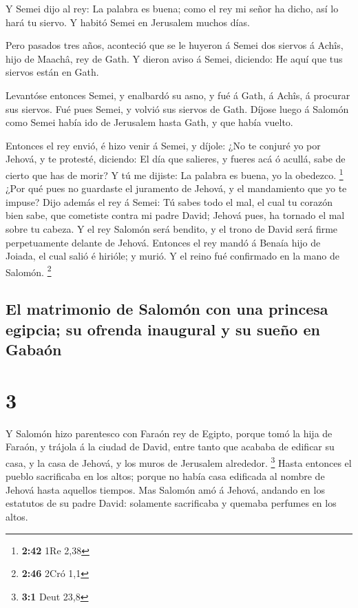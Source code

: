  Y Semei dijo al rey: La palabra es buena; como el rey mi
señor ha dicho, así lo hará tu siervo. Y habitó Semei en Jerusalem
muchos días.

 Pero pasados tres años, aconteció que se le huyeron á
Semei dos siervos á Achîs, hijo de Maachâ, rey de Gath. Y dieron aviso á
Semei, diciendo: He aquí que tus siervos están en Gath.

 Levantóse entonces Semei, y enalbardó su asno, y fué á
Gath, á Achîs, á procurar sus siervos. Fué pues Semei, y volvió sus
siervos de Gath.  Díjose luego á Salomón como Semei había
ido de Jerusalem hasta Gath, y que había vuelto.

 Entonces el rey envió, é hizo venir á Semei, y díjole:
¿No te conjuré yo por Jehová, y te protesté, diciendo: El día que
salieres, y fueres acá ó acullá, sabe de cierto que has de morir? Y tú
me dijiste: La palabra es buena, yo la obedezco. \footnote{\textbf{2:42}
  1Re 2,38}  ¿Por qué pues no guardaste el juramento de
Jehová, y el mandamiento que yo te impuse?  Dijo además
el rey á Semei: Tú sabes todo el mal, el cual tu corazón bien sabe, que
cometiste contra mi padre David; Jehová pues, ha tornado el mal sobre tu
cabeza.  Y el rey Salomón será bendito, y el trono de
David será firme perpetuamente delante de Jehová. 
Entonces el rey mandó á Benaía hijo de Joiada, el cual salió é hirióle;
y murió. Y el reino fué confirmado en la mano de Salomón. \footnote{\textbf{2:46}
  2Cró 1,1}

\hypertarget{el-matrimonio-de-salomuxf3n-con-una-princesa-egipcia-su-ofrenda-inaugural-y-su-sueuxf1o-en-gabauxf3n}{%
\subsection{El matrimonio de Salomón con una princesa egipcia; su
ofrenda inaugural y su sueño en
Gabaón}\label{el-matrimonio-de-salomuxf3n-con-una-princesa-egipcia-su-ofrenda-inaugural-y-su-sueuxf1o-en-gabauxf3n}}

\hypertarget{section-2}{%
\section{3}\label{section-2}}

 Y Salomón hizo parentesco con Faraón rey de Egipto,
porque tomó la hija de Faraón, y trájola á la ciudad de David, entre
tanto que acababa de edificar su casa, y la casa de Jehová, y los muros
de Jerusalem alrededor. \footnote{\textbf{3:1} Deut 23,8} 
Hasta entonces el pueblo sacrificaba en los altos; porque no había casa
edificada al nombre de Jehová hasta aquellos tiempos.  Mas
Salomón amó á Jehová, andando en los estatutos de su padre David:
solamente sacrificaba y quemaba perfumes en los altos.

